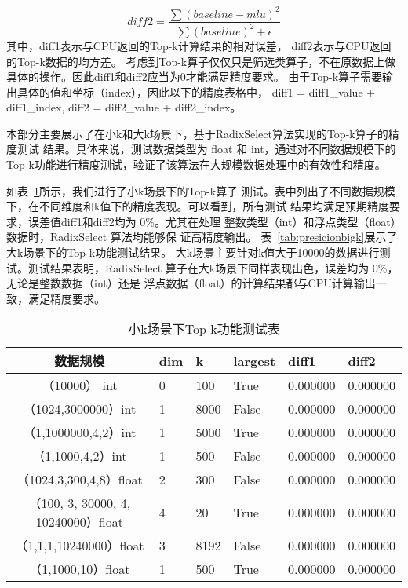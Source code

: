     \begin{equation}
    \label{eq:diff2}
    diff2 = \frac{\sum (baseline - mlu)^2}{\sum (baseline)^2 + \epsilon}
    \end{equation}
其中，diff1表示与CPU返回的Top-k计算结果的相对误差，
diff2表示与CPU返回的Top-k数据的均方差。
考虑到Top-k算子仅仅只是筛选类算子，不在原数据上做具体的操作。因此diff1和diff2应当为0才能满足精度要求。
由于Top-k算子需要输出具体的值和坐标（index），因此以下的精度表格中，
diff1 = diff1\_value + diff1\_index,
diff2 = diff2\_value + diff2\_index。


本部分主要展示了在小k和大k场景下，基于RadixSelect算法实现的Top-k算子的精度测试
结果。具体来说，测试数据类型为 float 和 int，通过对不同数据规模下的
Top-k功能进行精度测试，验证了该算法在大规模数据处理中的有效性和精度。


如表~\ref{tab:presicionsmallk}所示，我们进行了小k场景下的Top-k算子
 测试。表中列出了不同数据规模下，在不同维度和k值下的精度表现。可以看到，所有测试
 结果均满足预期精度要求，误差值diff1和diff2均为 0\%。尤其在处理
 整数类型（int）和浮点类型（float）数据时，RadixSelect 算法均能够保
 证高精度输出。
表~\ref{tab:presicionbigk}展示了大k场景下的Top-k功能测试结果。
大k场景主要针对k值大于10000的数据进行测试。测试结果表明，RadixSelect
 算子在大k场景下同样表现出色，误差均为 0\%，无论是整数数据（int）还是
 浮点数据（float）的计算结果都与CPU计算输出一致，满足精度要求。


\begin{table}
    \centering
    \caption{小k场景下Top-k功能测试表}
    \label{tab:presicionsmallk}
    \begin{tabular}{clllll}
        \toprule
        数据规模      &dim   & k  & largest & diff1    & diff2 \\
        \midrule
        （10000） int &0  & 100      & True      & 0.000000 & 0.000000 \\
        （1024,3000000）int&1 & 8000 & False      & 0.000000 & 0.000000 \\
        （1,1000000,4,2）int &1  & 5000 & True      & 0.000000 & 0.000000 \\
        （1,1000,4,2）int &1  & 500 & False      & 0.000000 & 0.000000 \\
        
        （1024,3,300,4,8）float&2 & 300 & False      & 0.000000 & 0.000000 \\
        （100, 3, 30000, 4, 10240000）float&4 & 20 & True      & 0.000000 & 0.000000 \\
        （1,1,1,10240000）float & 3 & 8192 & False      & 0.000000 & 0.000000 \\
        （1,1000,10）float & 1  & 500 & True      & 0.000000 & 0.000000 \\
        
    \bottomrule
    \end{tabular}
    \end{table}

